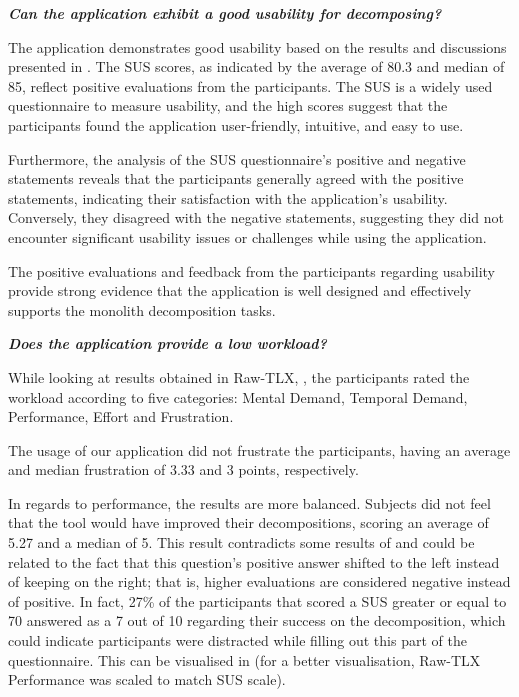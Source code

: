\textbf{\emph{Can the application exhibit a good usability for decomposing?}}

The application demonstrates good usability based on the results and
discussions presented in . The SUS scores, as indicated by the
average of 80.3 and median of 85, reflect positive evaluations from the
participants. The SUS is a widely used questionnaire to measure usability, and
the high scores suggest that the participants found the application
user-friendly, intuitive, and easy to use.

Furthermore, the analysis of the SUS questionnaire's positive and negative
statements reveals that the participants generally agreed with the positive
statements, indicating their satisfaction with the application's usability.
Conversely, they disagreed with the negative statements, suggesting they did
not encounter significant usability issues or challenges while using the
application.

The positive evaluations and feedback from the participants regarding usability
provide strong evidence that the application is well designed and effectively
supports the monolith decomposition tasks.

\textbf{\emph{Does the application provide a low workload?}}

While looking at results obtained in Raw-TLX, , the
participants rated the workload according to five categories: Mental Demand,
Temporal Demand, Performance, Effort and Frustration.

The usage of our application did not frustrate the participants, having an
average and median frustration of 3.33 and 3 points, respectively.

In regards to performance, the results are more balanced. Subjects did not feel
that the tool would have improved their decompositions, scoring an average of
5.27 and a median of 5. This result contradicts some results of 
and could be related to the fact that this question's positive answer shifted
to the left instead of keeping on the right; that is, higher evaluations are
considered negative instead of positive. In fact, 27\% of the participants that
scored a SUS greater or equal to 70 answered as a 7 out of 10 regarding their
success on the decomposition, which could indicate participants were distracted
while filling out this part of the questionnaire. This can be visualised in
 (for a better visualisation, Raw-TLX
Performance was scaled to match SUS scale).

